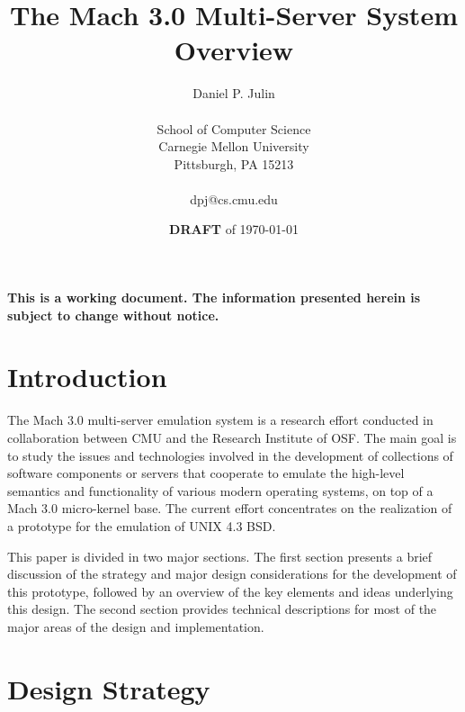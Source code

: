 

\newcommand{\comment}[1]{}

\topmargin 0in
\textheight 8in
\pagestyle{empty}
\makeatletter
\def\@oddfoot{\hfil\em DRAFT-\arabic{page}\hfil}
\let\@evenfoot=\@oddfoot
\makeatother



\title{The Mach 3.0 Multi-Server System \\
Overview}
\author{Daniel P. Julin \\
\\
School of Computer Science \\
Carnegie Mellon University \\
Pittsburgh, PA 15213 \\
\\
dpj@cs.cmu.edu}
\date{{\large {\bf DRAFT}} of \today}



\maketitle

{\large {\bf This is a working document. The information presented
herein is subject to change without notice. }}

\section{Introduction}

The Mach 3.0 multi-server emulation system is a research effort
conducted in collaboration between CMU and the Research Institute of
OSF. The main goal is to study the issues and technologies involved in
the development of collections of software components or servers that
cooperate to emulate the high-level semantics and functionality of
various modern operating systems, on top of a Mach 3.0 micro-kernel
base. The current effort concentrates on the realization of a
prototype for the emulation of UNIX 4.3 BSD.

This paper is divided in two major sections. The first section
presents a brief discussion of the strategy and major design
considerations for the development of this prototype, followed by an
overview of the key elements and ideas underlying this design. The
second section provides technical descriptions for most of the major
areas of the design and implementation.


\section{Design Strategy}

